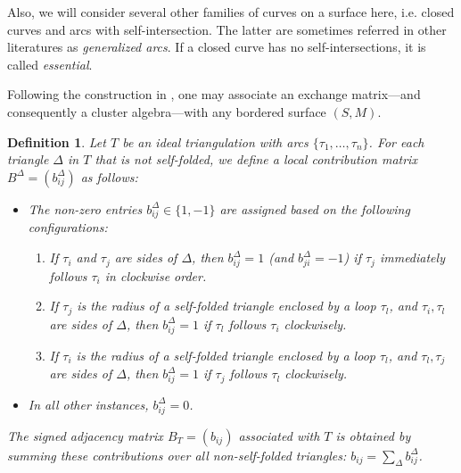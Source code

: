 \documentclass{article}
\newtheorem{definition}{Definition}
\theoremstyle{remark}
\begin{document}
Also, we will consider several other families of curves on a surface here, i.e. closed curves and arcs with self-intersection. The latter are sometimes referred in other literatures as \emph{generalized arcs}. If a closed curve has no self-intersections, it is called \emph{essential}.

Following the construction in \cite{FST-I}, one may associate an exchange matrix—and consequently a cluster algebra—with any bordered surface $(S, M)$.

\begin{definition}
Let $T$ be an ideal triangulation with arcs $\{\tau_1, \ldots, \tau_n\}$. For each triangle $\Delta$ in $T$ that is not self-folded, we define a local contribution matrix $B^{\Delta} = (b^{\Delta}_{ij})$ as follows:
\begin{itemize}
    \item The non-zero entries $b^{\Delta}_{ij} \in \{1, -1\}$ are assigned based on the following configurations:
    \begin{enumerate}[label=(\alph*)]
        \item If $\tau_i$ and $\tau_j$ are sides of $\Delta$, then $b^{\Delta}_{ij} = 1$ (and $b^{\Delta}_{ji} = -1$) if $\tau_j$ immediately follows $\tau_i$ in clockwise order.
        \item If $\tau_j$ is the radius of a self-folded triangle enclosed by a loop $\tau_l$, and $\tau_i, \tau_l$ are sides of $\Delta$, then $b^{\Delta}_{ij} = 1$ if $\tau_l$ follows $\tau_i$ clockwisely.
        \item If $\tau_i$ is the radius of a self-folded triangle enclosed by a loop $\tau_l$, and $\tau_l, \tau_j$ are sides of $\Delta$, then $b^{\Delta}_{ij} = 1$ if $\tau_j$ follows $\tau_l$ clockwisely.
    \end{enumerate}
    \item In all other instances, $b^{\Delta}_{ij} = 0$.
\end{itemize}

The \emph{signed adjacency matrix} $B_T = (b_{ij})$ associated with $T$ is obtained by summing these contributions over all non-self-folded triangles: $b_{ij} = \sum_{\Delta} b^{\Delta}_{ij}$.
\end{definition}
\end{document}

